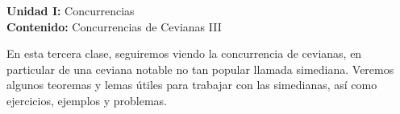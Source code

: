{\Large
    \textbf{Unidad I:} Concurrencias\vspace{2mm}\\
    \textbf{Contenido:} Concurrencias de Cevianas III
}

En esta tercera clase, seguiremos viendo la concurrencia de cevianas, en particular de una ceviana notable no tan popular llamada simediana.
Veremos algunos teoremas y lemas útiles para trabajar con las simedianas, así como ejercicios, ejemplos y problemas.